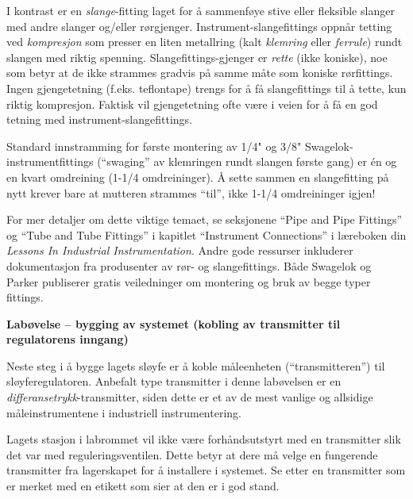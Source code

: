 \vskip 10pt

I kontrast er en {\it slange}-fitting laget for å sammenføye stive eller fleksible slanger med andre slanger og/eller rørgjenger.  Instrument-slangefittings oppnår tetting ved {\it kompresjon} som presser en liten metallring (kalt {\it klemring} eller {\it ferrule}) rundt slangen med riktig spenning.  Slangefittings-gjenger er {\it rette} (ikke koniske), noe som betyr at de ikke strammes gradvis på samme måte som koniske rørfittings.  Ingen gjengetetning (f.eks. teflontape) trengs for å få slangefittings til å tette, kun riktig kompresjon.  Faktisk vil gjengetetning ofte være i veien for å få en god tetning med instrument-slangefittings.

Standard innstramming for første montering av 1/4" og 3/8" Swagelok-instrumentfittings (``swaging'' av klemringen rundt slangen første gang) er én og en kvart omdreining (1-1/4 omdreininger).  Å sette sammen en slangefitting på nytt krever bare at mutteren strammes ``til'', ikke 1-1/4 omdreininger igjen!

\vskip 10pt

For mer detaljer om dette viktige temaet, se seksjonene ``Pipe and Pipe Fittings'' og ``Tube and Tube Fittings'' i kapitlet ``Instrument Connections'' i læreboken din {\it Lessons In Industrial Instrumentation}.  Andre gode ressurser inkluderer dokumentasjon fra produsenter av rør- og slangefittings.  Både Swagelok og Parker publiserer gratis veiledninger om montering og bruk av begge typer fittings.








\vfil \eject

\noindent
{\bf Labøvelse -- bygging av systemet (kobling av transmitter til regulatorens inngang)}

\vskip 5pt

Neste steg i å bygge lagets sløyfe er å koble måleenheten (``transmitteren'') til sløyferegulatoren.  Anbefalt type transmitter i denne labøvelsen er en {\it differansetrykk}-transmitter, siden dette er et av de mest vanlige og allsidige måleinstrumentene i industriell instrumentering.

Lagets stasjon i labrommet vil ikke være forhåndsutstyrt med en transmitter slik det var med reguleringsventilen.  Dette betyr at dere må velge en fungerende transmitter fra lagerskapet for å installere i systemet.  Se etter en transmitter som er merket med en etikett som sier at den er i god stand.

